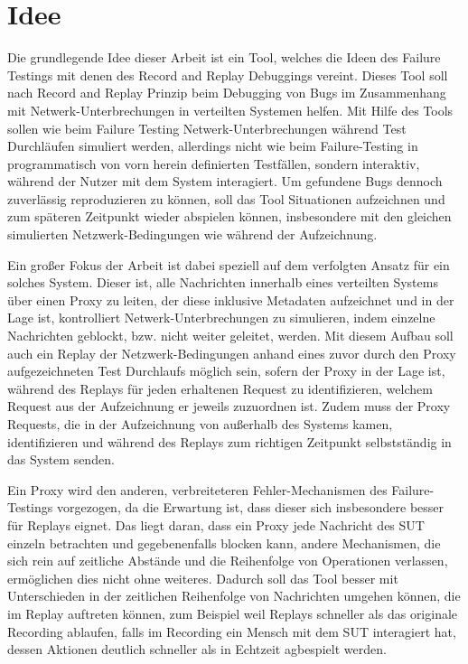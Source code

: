 \documentclass[12pt,a4paper]{report}
\begin{document}
\section{Idee}
Die grundlegende Idee dieser Arbeit ist ein Tool, welches die Ideen des Failure Testings mit denen des Record and Replay
Debuggings vereint. Dieses Tool soll nach Record and Replay Prinzip beim Debugging von Bugs im Zusammenhang mit
Netwerk-Unterbrechungen in verteilten Systemen helfen. Mit Hilfe des Tools sollen wie beim Failure Testing Netwerk-Unterbrechungen
während Test Durchläufen simuliert werden, allerdings nicht wie beim Failure-Testing in programmatisch von vorn herein definierten
Testfällen, sondern interaktiv, während der Nutzer mit dem System interagiert. Um gefundene Bugs dennoch zuverlässig reproduzieren
zu können, soll das Tool Situationen aufzeichnen und zum späteren Zeitpunkt wieder abspielen können, insbesondere mit den gleichen
simulierten Netzwerk-Bedingungen wie während der Aufzeichnung.

Ein großer Fokus der Arbeit ist dabei speziell auf dem verfolgten Ansatz für ein solches System. Dieser ist, alle Nachrichten
innerhalb eines verteilten Systems über einen Proxy zu leiten, der diese inklusive Metadaten aufzeichnet und in der Lage ist,
kontrolliert Netwerk-Unterbrechungen zu simulieren, indem einzelne Nachrichten geblockt, bzw. nicht weiter geleitet, werden.  Mit
diesem Aufbau soll auch ein Replay der Netzwerk-Bedingungen anhand eines zuvor durch den Proxy aufgezeichneten Test Durchlaufs
möglich sein, sofern der Proxy in der Lage ist, während des Replays für jeden erhaltenen Request zu identifizieren, welchem
Request aus der Aufzeichnung er jeweils zuzuordnen ist. Zudem muss der Proxy Requests, die in der Aufzeichnung von außerhalb des
Systems kamen, identifizieren und während des Replays zum richtigen Zeitpunkt selbstständig in das System senden.

Ein Proxy wird den anderen, verbreiteteren Fehler-Mechanismen des Failure-Testings vorgezogen, da die Erwartung ist, dass dieser
sich insbesondere besser für Replays eignet. Das liegt daran, dass ein Proxy jede Nachricht des SUT einzeln betrachten und
gegebenenfalls blocken kann, andere Mechanismen, die sich rein auf zeitliche Abstände und die Reihenfolge von Operationen
verlassen, ermöglichen dies nicht ohne weiteres. Dadurch soll das Tool besser mit Unterschieden in der zeitlichen Reihenfolge von
Nachrichten umgehen können, die im Replay auftreten können, zum Beispiel weil Replays schneller als das originale Recording
ablaufen, falls im Recording ein Mensch mit dem SUT interagiert hat, dessen Aktionen deutlich schneller als in Echtzeit agbespielt
werden.
\end{document}
